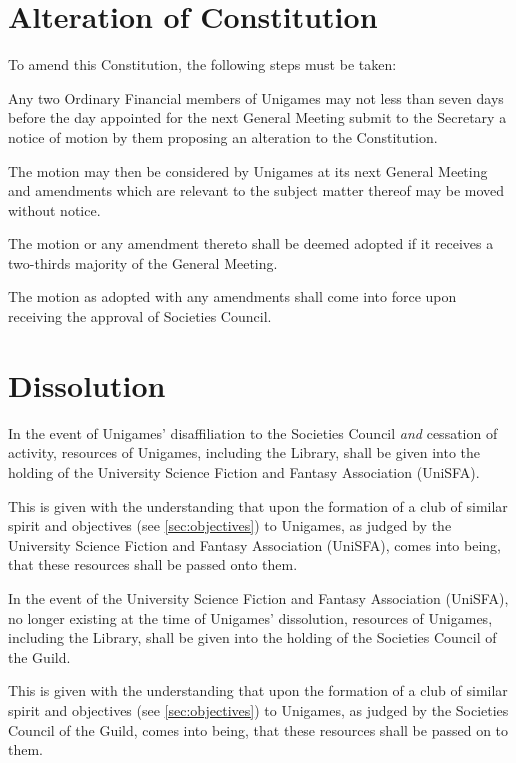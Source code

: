 \documentclass[a4paper]{article}
\begin{document}
\section{Alteration of Constitution} \label{sec:alteration}
\begin{myEnumerate}
    \item To amend this Constitution, the following steps must be taken:
        \begin{myEnumerate}
            \item Any two Ordinary Financial members of Unigames may not less than seven days before the day appointed for the next General Meeting submit to the Secretary a notice of motion by them proposing an alteration to the Constitution.
            \item The motion may then be considered by Unigames at its next General Meeting and amendments which are relevant to the subject matter thereof may be moved without notice.
            \item The motion or any amendment thereto shall be deemed adopted if it receives a two-thirds majority of the General Meeting.
            \item The motion as adopted with any amendments shall come into force upon receiving the approval of Societies Council.
        \end{myEnumerate}
\end{myEnumerate}


\section{Dissolution} \label{sec:dissolution}
\begin{myEnumerate}
    \item In the event of Unigames' disaffiliation to the Societies Council \emph{and} cessation of activity, resources of Unigames, including the Library, shall be given into the holding of the University Science Fiction and Fantasy Association (UniSFA).
        \begin{myEnumerate}
            \item This is given with the understanding that upon the formation of a club of similar spirit and objectives (see \cref{sec:objectives}) to Unigames, as judged by the University Science Fiction and Fantasy Association (UniSFA), comes into being, that these resources shall be passed onto them.
        \end{myEnumerate}
    \item In the event of the University Science Fiction and Fantasy Association (UniSFA), no longer existing at the time of Unigames' dissolution, resources of Unigames, including the Library, shall be given into the holding of the Societies Council of the Guild.
        \begin{myEnumerate}
            \item This is given with the understanding that upon the formation of a club of similar spirit and objectives (see \cref{sec:objectives}) to Unigames, as judged by the Societies Council of the Guild, comes into being, that these resources shall be passed on to them.
        \end{myEnumerate}
\end{myEnumerate}
\end{document}
